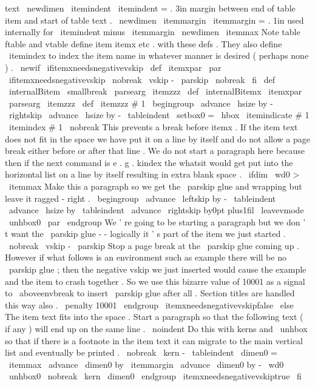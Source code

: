 text
\
newdimen
\
itemindent
\
itemindent
=
.
3in
%
margin
between
end
of
table
item
and
start
of
table
text
.
\
newdimen
\
itemmargin
\
itemmargin
=
.
1in
%
used
internally
for
\
itemindent
minus
\
itemmargin
\
newdimen
\
itemmax
%
Note
table
ftable
and
vtable
define
item
itemx
etc
.
with
%
these
defs
.
%
They
also
define
\
itemindex
%
to
index
the
item
name
in
whatever
manner
is
desired
(
perhaps
none
)
.
\
newif
\
ifitemxneedsnegativevskip
\
def
\
itemxpar
{
\
par
\
ifitemxneedsnegativevskip
\
nobreak
\
vskip
-
\
parskip
\
nobreak
\
fi
}
\
def
\
internalBitem
{
\
smallbreak
\
parsearg
\
itemzzz
}
\
def
\
internalBitemx
{
\
itemxpar
\
parsearg
\
itemzzz
}
\
def
\
itemzzz
#
1
{
\
begingroup
%
\
advance
\
hsize
by
-
\
rightskip
\
advance
\
hsize
by
-
\
tableindent
\
setbox0
=
\
hbox
{
\
itemindicate
{
#
1
}
}
%
\
itemindex
{
#
1
}
%
\
nobreak
%
This
prevents
a
break
before
itemx
.
%
%
If
the
item
text
does
not
fit
in
the
space
we
have
put
it
on
a
line
%
by
itself
and
do
not
allow
a
page
break
either
before
or
after
that
%
line
.
We
do
not
start
a
paragraph
here
because
then
if
the
next
%
command
is
e
.
g
.
kindex
the
whatsit
would
get
put
into
the
%
horizontal
list
on
a
line
by
itself
resulting
in
extra
blank
space
.
\
ifdim
\
wd0
>
\
itemmax
%
%
Make
this
a
paragraph
so
we
get
the
\
parskip
glue
and
wrapping
%
but
leave
it
ragged
-
right
.
\
begingroup
\
advance
\
leftskip
by
-
\
tableindent
\
advance
\
hsize
by
\
tableindent
\
advance
\
rightskip
by0pt
plus1fil
\
leavevmode
\
unhbox0
\
par
\
endgroup
%
%
We
'
re
going
to
be
starting
a
paragraph
but
we
don
'
t
want
the
%
\
parskip
glue
-
-
logically
it
'
s
part
of
the
item
we
just
started
.
\
nobreak
\
vskip
-
\
parskip
%
%
Stop
a
page
break
at
the
\
parskip
glue
coming
up
.
However
if
%
what
follows
is
an
environment
such
as
example
there
will
be
no
%
\
parskip
glue
;
then
the
negative
vskip
we
just
inserted
would
%
cause
the
example
and
the
item
to
crash
together
.
So
we
use
this
%
bizarre
value
of
10001
as
a
signal
to
\
aboveenvbreak
to
insert
%
\
parskip
glue
after
all
.
Section
titles
are
handled
this
way
also
.
%
\
penalty
10001
\
endgroup
\
itemxneedsnegativevskipfalse
\
else
%
The
item
text
fits
into
the
space
.
Start
a
paragraph
so
that
the
%
following
text
(
if
any
)
will
end
up
on
the
same
line
.
\
noindent
%
Do
this
with
kerns
and
\
unhbox
so
that
if
there
is
a
footnote
in
%
the
item
text
it
can
migrate
to
the
main
vertical
list
and
%
eventually
be
printed
.
\
nobreak
\
kern
-
\
tableindent
\
dimen0
=
\
itemmax
\
advance
\
dimen0
by
\
itemmargin
\
advance
\
dimen0
by
-
\
wd0
\
unhbox0
\
nobreak
\
kern
\
dimen0
\
endgroup
\
itemxneedsnegativevskiptrue
\
fi
}
